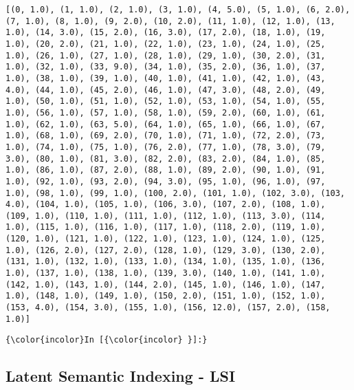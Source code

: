     \begin{Verbatim}[commandchars=\\\{\}]
[(0, 1.0), (1, 1.0), (2, 1.0), (3, 1.0), (4, 5.0), (5, 1.0), (6, 2.0), (7, 1.0), (8, 1.0), (9, 2.0), (10, 2.0), (11, 1.0), (12, 1.0), (13, 1.0), (14, 3.0), (15, 2.0), (16, 3.0), (17, 2.0), (18, 1.0), (19, 1.0), (20, 2.0), (21, 1.0), (22, 1.0), (23, 1.0), (24, 1.0), (25, 1.0), (26, 1.0), (27, 1.0), (28, 1.0), (29, 1.0), (30, 2.0), (31, 1.0), (32, 1.0), (33, 9.0), (34, 1.0), (35, 2.0), (36, 1.0), (37, 1.0), (38, 1.0), (39, 1.0), (40, 1.0), (41, 1.0), (42, 1.0), (43, 4.0), (44, 1.0), (45, 2.0), (46, 1.0), (47, 3.0), (48, 2.0), (49, 1.0), (50, 1.0), (51, 1.0), (52, 1.0), (53, 1.0), (54, 1.0), (55, 1.0), (56, 1.0), (57, 1.0), (58, 1.0), (59, 2.0), (60, 1.0), (61, 1.0), (62, 1.0), (63, 5.0), (64, 1.0), (65, 1.0), (66, 1.0), (67, 1.0), (68, 1.0), (69, 2.0), (70, 1.0), (71, 1.0), (72, 2.0), (73, 1.0), (74, 1.0), (75, 1.0), (76, 2.0), (77, 1.0), (78, 3.0), (79, 3.0), (80, 1.0), (81, 3.0), (82, 2.0), (83, 2.0), (84, 1.0), (85, 1.0), (86, 1.0), (87, 2.0), (88, 1.0), (89, 2.0), (90, 1.0), (91, 1.0), (92, 1.0), (93, 2.0), (94, 3.0), (95, 1.0), (96, 1.0), (97, 1.0), (98, 1.0), (99, 1.0), (100, 2.0), (101, 1.0), (102, 3.0), (103, 4.0), (104, 1.0), (105, 1.0), (106, 3.0), (107, 2.0), (108, 1.0), (109, 1.0), (110, 1.0), (111, 1.0), (112, 1.0), (113, 3.0), (114, 1.0), (115, 1.0), (116, 1.0), (117, 1.0), (118, 2.0), (119, 1.0), (120, 1.0), (121, 1.0), (122, 1.0), (123, 1.0), (124, 1.0), (125, 1.0), (126, 2.0), (127, 2.0), (128, 1.0), (129, 3.0), (130, 2.0), (131, 1.0), (132, 1.0), (133, 1.0), (134, 1.0), (135, 1.0), (136, 1.0), (137, 1.0), (138, 1.0), (139, 3.0), (140, 1.0), (141, 1.0), (142, 1.0), (143, 1.0), (144, 2.0), (145, 1.0), (146, 1.0), (147, 1.0), (148, 1.0), (149, 1.0), (150, 2.0), (151, 1.0), (152, 1.0), (153, 4.0), (154, 3.0), (155, 1.0), (156, 12.0), (157, 2.0), (158, 1.0)]

    \end{Verbatim}

    \begin{Verbatim}[commandchars=\\\{\}]
{\color{incolor}In [{\color{incolor} }]:} 
\end{Verbatim}

    \subsection{Latent Semantic Indexing -
LSI}\label{latent-semantic-indexing---lsi}

